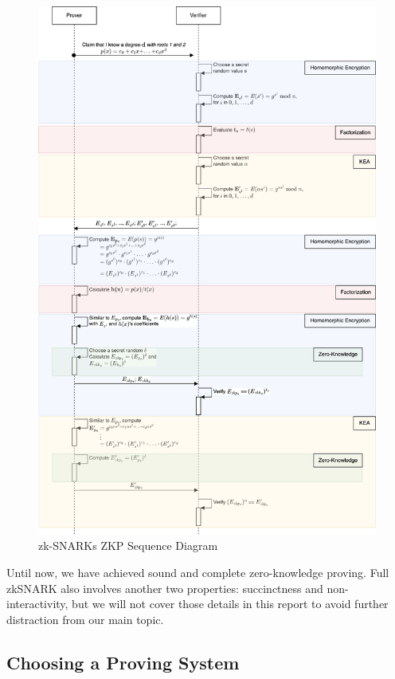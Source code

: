 \documentclass[
]{report}
\begin{document}
\begin{figure}
\centering
\includegraphics[width=\textwidth,height=\textheight,keepaspectratio]{zksnark.png}
\caption{zk-SNARKs ZKP Sequence Diagram}
\end{figure}

Until now, we have achieved sound and complete zero-knowledge proving.
Full zkSNARK also involves another two properties: succinctness
and non-interactivity, but we will not cover those details in this
report to avoid further distraction from our main topic.

\subsection{Choosing a Proving System}
\end{document}
